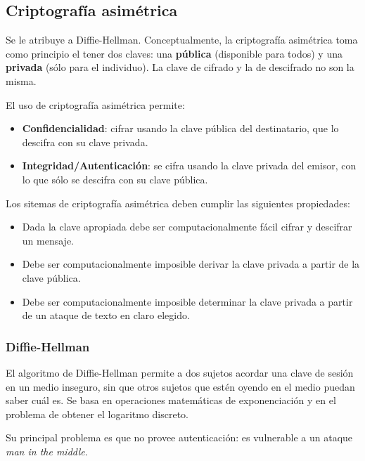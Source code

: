 \subsection{Criptografía asimétrica}

Se le atribuye a Diffie-Hellman. Conceptualmente, la criptografía asimétrica toma como principio el tener dos claves: una \textbf{pública} (disponible para todos) y una \textbf{privada} (sólo para el individuo). La clave de cifrado y la de descifrado no son la misma.

El uso de criptografía asimétrica permite:
\begin{itemize}
	\item \textbf{Confidencialidad}: cifrar usando la clave pública del destinatario, que lo descifra con su clave privada.
	\item \textbf{Integridad/Autenticación}: se cifra usando la clave privada del emisor, con lo que sólo se descifra con su clave pública.
\end{itemize}

Los sitemas de criptografía asimétrica deben cumplir las siguientes propiedades:
\begin{itemize}
	\item Dada la clave apropiada debe ser computacionalmente fácil cifrar y descifrar un mensaje.
	\item Debe ser computacionalmente imposible derivar la clave privada a partir de la clave pública.
	\item Debe ser computacionalmente imposible determinar la clave privada a partir de un ataque de texto en claro elegido.
\end{itemize}

\subsubsection{Diffie-Hellman}
El algoritmo de Diffie-Hellman permite a dos sujetos acordar una clave de sesión en un medio inseguro, sin que otros sujetos que estén oyendo en el medio puedan saber cuál es. Se basa en operaciones matemáticas de exponenciación y en el problema de obtener el logaritmo discreto.

Su principal problema es que no provee autenticación: es vulnerable a un ataque \emph{man in the middle}.

~\newline

